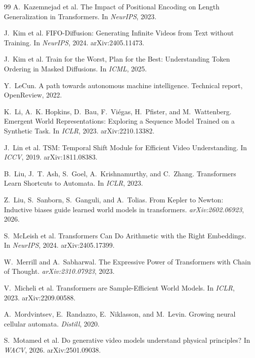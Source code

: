 \documentclass[11pt]{article}
\begin{document}
\begin{thebibliography}{99}
A.~Kazemnejad et al.
The Impact of Positional Encoding on Length Generalization in Transformers. In \emph{NeurIPS}, 2023.

J.~Kim et al.
FIFO-Diffusion: Generating Infinite Videos from Text without Training. In \emph{NeurIPS}, 2024. arXiv:2405.11473.

J.~Kim et al.
Train for the Worst, Plan for the Best: Understanding Token Ordering in Masked Diffusions. In \emph{ICML}, 2025.

Y.~LeCun.
A path towards autonomous machine intelligence.
Technical report, OpenReview, 2022.

K.~Li, A.~K. Hopkins, D.~Bau, F.~Vi\'egas, H.~Pfister, and M.~Wattenberg.
Emergent World Representations: Exploring a Sequence Model Trained on a
Synthetic Task. In \emph{ICLR}, 2023. arXiv:2210.13382.

J.~Lin et al.
TSM: Temporal Shift Module for Efficient Video Understanding. In \emph{ICCV}, 2019. arXiv:1811.08383.

B.~Liu, J.~T. Ash, S.~Goel, A.~Krishnamurthy, and C.~Zhang.
Transformers Learn Shortcuts to Automata. In \emph{ICLR}, 2023.

Z.~Liu, S.~Sanborn, S.~Ganguli, and A.~Tolias.
From Kepler to Newton: Inductive biases guide learned world models in transformers.
\emph{arXiv:2602.06923}, 2026.

S.~McLeish et al.
Transformers Can Do Arithmetic with the Right Embeddings. In \emph{NeurIPS}, 2024. arXiv:2405.17399.

W.~Merrill and A.~Sabharwal.
The Expressive Power of Transformers with Chain of Thought. \emph{arXiv:2310.07923}, 2023.

V.~Micheli et al.
Transformers are Sample-Efficient World Models. In \emph{ICLR}, 2023. arXiv:2209.00588.

A.~Mordvintsev, E.~Randazzo, E.~Niklasson, and M.~Levin.
Growing neural cellular automata. \emph{Distill}, 2020.

S.~Motamed et al.
Do generative video models understand physical principles? In \emph{WACV}, 2026. arXiv:2501.09038.


\end{thebibliography}
\end{document}
